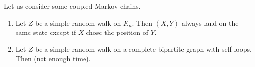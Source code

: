 \begin{example}
    Let us consider some coupled Markov chains.
    \begin{enumerate}
        \item Let $Z$ be a simple random walk on $K_n$.
              Then $(X,Y)$ always land on the same state except if $X$ chose the position of $Y$.
        \item Let $Z$ be a simple random walk on a complete bipartite graph with self-loops.
              Then (not enough time).
    \end{enumerate}
\end{example}
